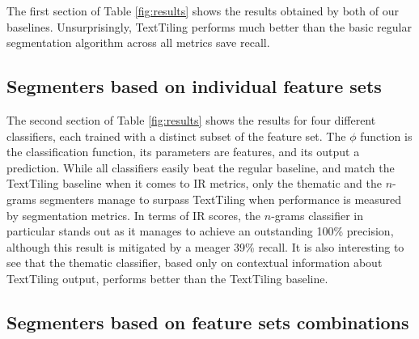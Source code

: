 The first section of Table \ref{fig:results} shows the results obtained by both of our baselines. Unsurprisingly, TextTiling performs much better than the basic regular segmentation algorithm across all metrics save recall.

\subsection{Segmenters based on individual feature sets}

The second section of Table \ref{fig:results} shows the results for four different classifiers, each trained with a distinct subset of the feature set. The $\phi$ function is the classification function, its parameters are features, and its output a prediction. While all classifiers easily beat the regular baseline, and match the TextTiling baseline when it comes to IR metrics, only the thematic and the $n$-grams segmenters manage to surpass TextTiling when performance is measured by segmentation metrics. In terms of IR scores, the $n$-grams classifier in particular stands out as it manages to achieve an outstanding 100\% precision, although this result is mitigated by a meager 39\% recall. It is also interesting to see that the thematic classifier, based only on contextual information about TextTiling output, performs better than the TextTiling baseline.


\subsection{Segmenters based on feature sets combinations}

